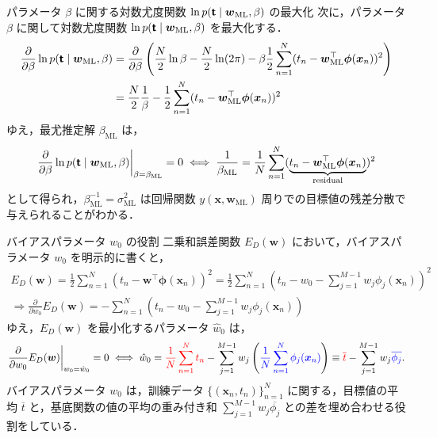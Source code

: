 \documentclass[uplatex,11pt,dvipdfmx,aspectratio=169,unicode,t]{beamer}
\numberwithin{equation}{section}
\newcommand{\tb}[1]{\textbf{#1}}
\newcommand{\ts}[1]{\textsf{#1}}
\newcommand{\bs}[1]{\boldsymbol{#1}}
\newcommand{\1}{\bs{1}}
\newcommand{\0}{\bs{0}}
\begin{document}
\begin{frame}{パラメータ $\beta$ に関する対数尤度関数 $\ln p(\tb{\ts{t}} \mid \bs{w}_{\text{ML}},\beta)$ の最大化}
    次に，パラメータ $\beta$ に関して対数尤度関数 $\ln p(\tb{\ts{t}} \mid \bs{w}_{\text{ML}},\beta)$ を最大化する．
    \begin{align}
        \frac{\partial}{\partial{\beta}} \ln p(\tb{\ts{t}} \mid \bs{w}_{\text{ML}},\beta) &= \frac{\partial}{\partial{\beta}} \left(\frac{N}{2} \ln \beta - \frac{N}{2} \ln (2\pi) - \beta \frac{1}{2} \sum_{n=1}^{N} (t_{n} - \bs{w}_{\text{ML}}^{\top}\bs{\phi}(\bs{x}_{n}))^{2}\right) \\
        &= \frac{N}{2} \frac{1}{\beta} - \frac{1}{2} \sum_{n=1}^{N} (t_{n} - \bs{w}_{\text{ML}}^{\top}\bs{\phi}(\bs{x}_{n}))^{2}
    \end{align}
    ゆえ，最尤推定解 $\beta_{\text{ML}}$ は，
    \begin{equation}
        \left.\frac{\partial}{\partial{\beta}} \ln p(\tb{\ts{t}} \mid \bs{w}_{\text{ML}},\beta)\right|_{\beta = \beta_{\text{ML}}} = 0 \iff \frac{1}{\beta_{\text{ML}}} = \frac{1}{N} \sum_{n=1}^{N} (\underbrace{t_{n} - \bs{w}_{\text{ML}}^{\top}\bs{\phi}(\bs{x}_{n})}_{\text{residual}})^{2}
    \end{equation}
    として得られ，$\beta_{\text{ML}}^{-1} = \sigma_{\text{ML}}^{2}$ は回帰関数 $y(\bs{x},\bs{w}_{\text{ML}})$ 周りでの目標値の残差分散で与えられることがわかる．
\end{frame}

\begin{frame}{バイアスパラメータ $w_{0}$ の役割}
    二乗和誤差関数 $E_{D}(\bs{w})$ において，バイアスパラメータ $w_{0}$ を明示的に書くと，
    \begin{gather}
        E_{D}(\bs{w}) = \frac{1}{2} \sum_{n=1}^{N} (t_{n} - \bs{w}^{\top}\bs{\phi}(\bs{x}_{n}))^{2} = \frac{1}{2} \sum_{n=1}^{N} \left(t_{n} - w_{0} - \sum_{j=1}^{M-1} w_{j} \phi_{j}(\bs{x}_{n})\right)^{2} \\
        \Longrightarrow \frac{\partial}{\partial{w_{0}}} E_{D}(\bs{w}) = - \sum_{n=1}^{N} \left(t_{n} - w_{0} - \sum_{j=1}^{M-1} w_{j} \phi_{j}(\bs{x}_{n})\right)
    \end{gather}
    ゆえ，$E_{D}(\bs{w})$ を最小化するパラメータ $\hat{w}_{0}$ は，
    \begin{equation}
        \left.\frac{\partial}{\partial{w_{0}}} E_{D}(\bs{w})\right|_{w_{0} = \hat{w}_{0}} = 0 \iff \hat{w}_{0} = \textcolor{red}{\frac{1}{N} \sum_{n=1}^{N} t_{n}} - \sum_{j=1}^{M-1} w_{j} \left(\textcolor{blue}{\frac{1}{N} \sum_{n=1}^{N} \phi_{j}(\bs{x}_{n})}\right) \equiv \textcolor{red}{\overline{t}} - \sum_{j=1}^{M-1} w_{j} \textcolor{blue}{\overline{\phi_{j}}}.
    \end{equation}
    バイアスパラメータ $w_{0}$ は，訓練データ $\{(\bs{x}_{n}, t_{n})\}_{n=1}^{N}$ に関する，目標値の平均 $\overline{t}$ と，基底関数の値の平均の重み付き和 $\sum_{j=1}^{M-1} w_{j} \overline{\phi_{j}}$ との差を埋め合わせる役割をしている．
\end{frame}
\end{document}
